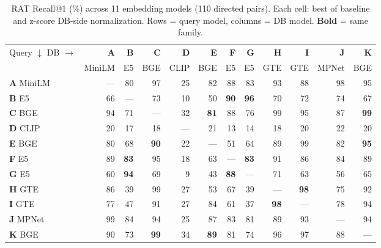 \begin{table}[t]
\centering
\caption{RAT Recall@1 (\%) across 11 embedding models (110 directed pairs).
Each cell: best of baseline and z-score DB-side normalization.
Rows = query model, columns = DB model. \textbf{Bold} = same family.}
\label{tab:matrix}
\small
\begin{tabular}{lrrrrrrrrrrr}
\toprule
Query $\downarrow$ DB $\rightarrow$ & \textbf{A} & \textbf{B} & \textbf{C} & \textbf{D} & \textbf{E} & \textbf{F} & \textbf{G} & \textbf{H} & \textbf{I} & \textbf{J} & \textbf{K} \\
 & {\scriptsize MiniLM} & {\scriptsize E5} & {\scriptsize BGE} & {\scriptsize CLIP} & {\scriptsize BGE} & {\scriptsize E5} & {\scriptsize E5} & {\scriptsize GTE} & {\scriptsize GTE} & {\scriptsize MPNet} & {\scriptsize BGE} \\
\midrule
\textbf{A} {\scriptsize MiniLM} & --- & 80 & 97 & {\color{red}25} & 82 & 88 & 83 & 93 & 88 & 98 & 95 \\
\textbf{B} {\scriptsize E5} & 66 & --- & 73 & {\color{red}10} & 50 & \textbf{90} & \textbf{96} & 70 & 72 & 74 & 67 \\
\textbf{C} {\scriptsize BGE} & 94 & 71 & --- & 32 & \textbf{81} & 88 & 76 & 99 & 95 & 87 & \textbf{99} \\
\textbf{D} {\scriptsize CLIP} & {\color{red}20} & {\color{red}17} & {\color{red}18} & --- & {\color{red}21} & {\color{red}13} & {\color{red}14} & {\color{red}18} & {\color{red}20} & {\color{red}22} & {\color{red}20} \\
\textbf{E} {\scriptsize BGE} & 80 & 68 & \textbf{90} & {\color{red}22} & --- & 51 & 64 & 89 & 99 & 82 & \textbf{95} \\
\textbf{F} {\scriptsize E5} & 89 & \textbf{83} & 95 & {\color{red}18} & 63 & --- & \textbf{83} & 91 & 86 & 84 & 89 \\
\textbf{G} {\scriptsize E5} & 60 & \textbf{94} & 69 & {\color{red}9} & 43 & \textbf{88} & --- & 71 & 63 & 56 & 65 \\
\textbf{H} {\scriptsize GTE} & 86 & 39 & 99 & {\color{red}27} & 53 & 67 & 39 & --- & \textbf{98} & 75 & 92 \\
\textbf{I} {\scriptsize GTE} & 77 & 47 & 91 & {\color{red}27} & 84 & 61 & 37 & \textbf{98} & --- & 78 & 94 \\
\textbf{J} {\scriptsize MPNet} & 99 & 84 & 94 & {\color{red}25} & 87 & 83 & 81 & 89 & 93 & --- & 94 \\
\textbf{K} {\scriptsize BGE} & 90 & 73 & \textbf{99} & 34 & \textbf{89} & 81 & 74 & 96 & 97 & 88 & --- \\
\bottomrule
\end{tabular}
\end{table}

